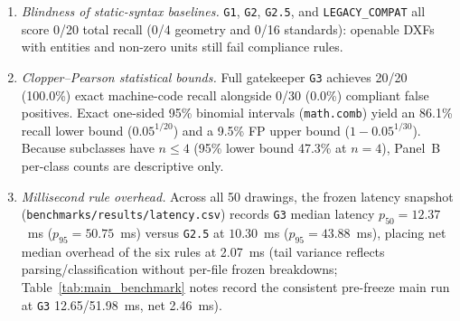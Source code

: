 \documentclass[nocopyright,nolists,upint,varvw,hyphenate]{asmejour}
\begin{document}
\begin{enumerate}
\item \emph{Blindness of static-syntax baselines.} \texttt{G1}, \texttt{G2}, \texttt{G2.5}, and \texttt{LEGACY\_COMPAT} all score 0/20 total recall (0/4 geometry and 0/16 standards): openable DXFs with entities and non-zero units still fail compliance rules.
\item \emph{Clopper--Pearson statistical bounds.} Full gatekeeper \texttt{G3} achieves 20/20 (100.0\%) exact machine-code recall alongside 0/30 (0.0\%) compliant false positives. Exact one-sided 95\% binomial intervals (\texttt{math.comb}) yield an 86.1\% recall lower bound ($0.05^{1/20}$) and a 9.5\% FP upper bound ($1 - 0.05^{1/30}$). Because subclasses have $n \le 4$ (95\% lower bound 47.3\% at $n = 4$), Panel~B per-class counts are descriptive only.
\item \emph{Millisecond rule overhead.} Across all 50 drawings, the frozen latency snapshot (\texttt{benchmarks/\allowbreak results/\allowbreak latency.csv}) records \texttt{G3} median latency $p_{50} = 12.37$~ms ($p_{95} = 50.75$~ms) versus \texttt{G2.5} at $10.30$~ms ($p_{95} = 43.88$~ms), placing net median overhead of the six rules at 2.07~ms (tail variance reflects parsing/classification without per-file frozen breakdowns; Table~\ref{tab:main_benchmark} notes record the consistent pre-freeze main run at \texttt{G3} 12.65/51.98~ms, net 2.46~ms).
\end{enumerate}
\end{document}
